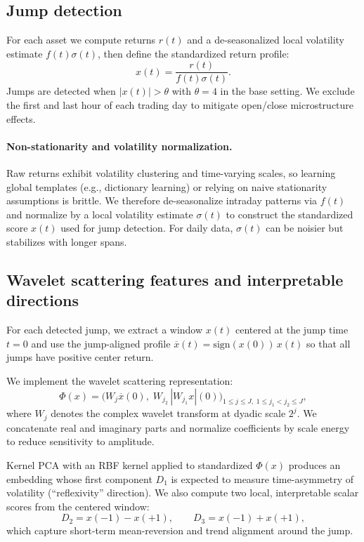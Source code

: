 \documentclass[10pt]{article}
\begin{document}
\subsection{Jump detection}
For each asset we compute returns $r(t)$ and a de-seasonalized local volatility estimate $f(t)\sigma(t)$, then define the standardized return profile:
\[
x(t) = \frac{r(t)}{f(t)\sigma(t)}.
\]
Jumps are detected when $|x(t)|>\theta$ with $\theta=4$ in the base setting. We exclude the first and last hour of each trading day to mitigate open/close microstructure effects.

\paragraph{Non-stationarity and volatility normalization.}
Raw returns exhibit volatility clustering and time-varying scales, so learning global templates (e.g., dictionary learning) or relying on naive stationarity assumptions is brittle. We therefore de-seasonalize intraday patterns via $f(t)$ and normalize by a local volatility estimate $\sigma(t)$ to construct the standardized score $x(t)$ used for jump detection. For daily data, $\sigma(t)$ can be noisier but stabilizes with longer spans.

\subsection{Wavelet scattering features and interpretable directions}
For each detected jump, we extract a window $x(t)$ centered at the jump time $t=0$ and use the jump-aligned profile $\overline{x}(t)=\mathrm{sign}(x(0))\,x(t)$ so that all jumps have positive center return.

We implement the wavelet scattering representation:
\[
\Phi(x) = \big(W_j \overline{x}(0),\; W_{j_2}\,|W_{j_1}x|(0)\big)_{1\le j \le J,\; 1\le j_1 < j_2\le J},
\]
where $W_j$ denotes the complex wavelet transform at dyadic scale $2^j$. We concatenate real and imaginary parts and normalize coefficients by scale energy to reduce sensitivity to amplitude.

Kernel PCA with an RBF kernel applied to standardized $\Phi(x)$ produces an embedding whose first component $D_1$ is expected to measure time-asymmetry of volatility (``reflexivity'' direction). We also compute two local, interpretable scalar scores from the centered window:
\[
D_2 = x(-1) - x(+1),\qquad D_3 = x(-1) + x(+1),
\]
which capture short-term mean-reversion and trend alignment around the jump.
\end{document}
